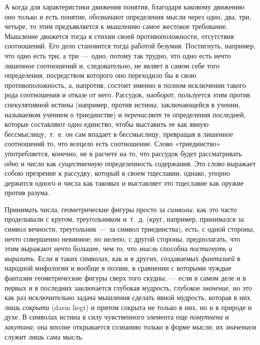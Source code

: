 А когда для характеристики движения понятия, благодаря каковому движению оно
только и есть понятие, обозначают определения мысли через одно, два, три,
четыре, то этим предъявляется к мышлению самое жестокое требование.
Мышление движется тогда в стихии своей противоположности, отсутствия
соотношений. Его дело становится тогда работой безумия. Постигнуть,
например, что одно есть три, а три —~одно, потому так трудно, что одно есть
нечто лишенное соотношений и, следовательно, не являет в самом себе того
определения, посредством которого оно переходило бы в свою
противоположность, а, напротив, состоит именно в полном исключении такого
рода соотношения и отказе от него. Рассудок, наоборот, пользуется этим
против спекулятивной истины (например, против истины, заключающейся в
учении, называемом учением о триединстве) и
{\em перечисляет} те определения последней, которые
составляют одно единство, чтобы выставить ее как явную бессмыслицу,~т.~е.
он сам впадает в бессмыслицу, превращая в лишенное соотношений то, что
всецело есть соотношение. Слово «триединство» употребляется, конечно, не в
расчете на то, что рассудок будет рассматривать
{\em одно} и число как
{\em существенную} определенность содержания. Это слово
выражает собою презрение к рассудку, который в своем тщеславии, однако,
упорно держится одного и числа как таковых и выставляет это тщеславие как
оружие против разума.

Принимать числа, геометрические фигуры просто за
{\em символы}, как это часто проделывали с кругом,
треугольником и~т.~д. (круг, например, принимался за символ вечности,
треугольник —~за символ триединства), есть, с одной стороны, нечто
совершенно невинное; но нелепо, с другой стороны, предполагать, что этим
выражают нечто большее, чем то, что {\em мысль}
способна {\em постигнуть и выразить}. Если в таких
символах, как и в других, создаваемых {\em фантазией} в
народной мифологии и вообще в поэзии, в сравнении с которыми чуждые
фантазии геометрические фигуры сверх того скудны, — если в самом деле и в
первых и в последних заключается глубокая мудрость, глубокое
{\em значение}, но это как раз исключительно задача
мышления сделать явной мудрость, которая в них лишь
{\em сокрыта} (darin liegt) и притом сокрыта не только
в них, но и в природе и духе. В символах истина в силу чувственного
элемента еще {\em помутнена} и
{\em закутана}; она вполне открывается сознанию только
в форме мысли; их {\em значением} служит лишь сама
мысль.

